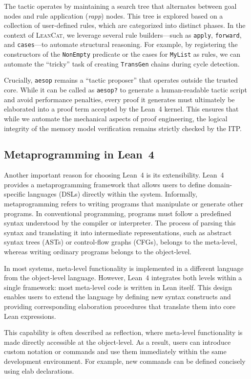 The tactic operates by maintaining a search tree that alternates between goal nodes and rule application (\textit{rapp}) nodes. This tree is explored based on a collection of user-defined rules, which are categorized into distinct phases. In the context of \textsc{LeanCat}, we leverage several rule builders—such as \texttt{apply}, \texttt{forward}, and \texttt{cases}—to automate structural reasoning. For example, by registering the constructors of the \texttt{NonEmpty} predicate or the cases for \texttt{MyList} as rules, we can automate the ``tricky'' task of creating \texttt{TransGen} chains during cycle detection. 

Crucially, \texttt{aesop} remains a ``tactic proposer'' that operates outside the trusted core. While it can be called as \texttt{aesop?} to generate a human-readable tactic script and avoid performance penalties, every proof it generates must ultimately be elaborated into a proof term accepted by the Lean~4 kernel. This ensures that while we automate the mechanical aspects of proof engineering, the logical integrity of the memory model verification remains strictly checked by the ITP.

\subsection{Metaprogramming in Lean~4}

Another important reason for choosing Lean~4 is its extensibility. Lean~4 provides a metaprogramming framework that allows users to define domain-specific languages (DSLs) directly within the system. Informally, metaprogramming refers to writing programs that manipulate or generate other programs. In conventional programming, programs must follow a predefined syntax understood by the compiler or interpreter. The process of parsing this syntax and translating it into intermediate representations, such as abstract syntax trees (ASTs) or control-flow graphs (CFGs), belongs to the meta-level, whereas writing ordinary programs belongs to the object-level.

In most systems, meta-level functionality is implemented in a different language from the object-level language. However, Lean~4 integrates both levels within a single framework: most meta-level code is written in Lean itself. This design enables users to extend the language by defining new syntax constructs and providing corresponding elaboration procedures that translate them into core Lean expressions.

This capability is often described as reflection, where meta-level functionality is made directly accessible at the object-level. As a result, users can introduce custom notation or commands and use them immediately within the same development environment. For example, new commands can be defined concisely using elab declarations.

